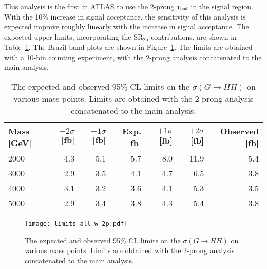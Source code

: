     This analysis is the first in ATLAS to use the 2-prong $\tau_{\text{had}}$ in the signal region.
    With the 10\% increase in signal acceptance, the sensitivity of this analysis is expected improve roughly linearly with the increase in signal acceptance.
    The expected upper-limits, incorporating the $\mathrm{SR}_\mathrm{2p}$ contributions, are shown in Table~\ref{tab:limits_w_2p}.
    The Brazil band plots are shown in Figure~\ref{fig:limits_w_2p}.
    The limits are obtained with a 10-bin counting experiment, with the 2-prong analysis 
    concatenated to the main analysis. 
    \begin{table}[htbp]
        \caption{
            The expected and observed 95\% CL limits on the $\sigma(G\rightarrow HH)$ on various mass points. 
            Limits are obtained with the 2-prong analysis concatenated to the main analysis.
        }
        \label{tab:limits_w_2p}
        \centering
        \begin{tabular}{lrrrrrr}
            \toprule
            Mass [GeV]   & $-2\sigma$ [fb]   & $-1\sigma$ [fb]   & Exp. [fb]   & $+1\sigma$ [fb]   & $+2\sigma$ [fb] & Observed [fb]\\
            \midrule
            2000         & 4.3               & 5.1               & 5.7         & 8.0               & 11.9            & 5.4\\
            3000         & 2.9               & 3.5               & 4.1         & 4.7               & 6.5             & 3.8\\
            4000         & 3.1               & 3.2               & 3.6         & 4.1               & 5.3             & 3.5\\
            5000         & 2.9               & 3.4               & 3.8         & 4.3               & 5.4             & 3.8\\
            \bottomrule
        \end{tabular}
    \end{table}
    \begin{figure}[htbp]
        \centering
        \texttt{[image: limits\_all\_w\_2p.pdf]}
        \caption{
            The expected and observed 95\% CL limits on the $\sigma(G\rightarrow HH)$ on various mass points. 
            Limits are obtained with the 2-prong analysis concatenated to the main analysis.
        }
        \label{fig:limits_w_2p}
    \end{figure}